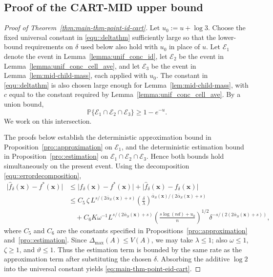 \documentclass[11pt]{article}
\theoremstyle{plain}
\theoremstyle{definition}
\theoremstyle{remark}
\theoremstyle{plain}
\newcommand{\bx}{\mathbf{x}}
\renewcommand{\P}{\mathbb{P}}
\newcommand{\1}{\mathbbm{1}}
\begin{document}
\subsection{Proof of the CART-MID upper bound}

\begin{proof}[Proof of Theorem~\ref{thm:main-thm-point-id-cart}]
Let $u_0:=u+\log 3$.
Choose the fixed universal constant in \eqref{equ::deltathm} sufficiently large so that the lower-bound requirements on $\delta$ used below also hold with $u_0$ in place of $u$.
Let $\mathcal{E}_1$ denote the event in Lemma~\ref{lemma:unif_conc_id},
let $\mathcal{E}_2$ be the event in
Lemma~\ref{lemma:unif_conc_cell_ave},
and let $\mathcal E_3$ be
the event in Lemma~\ref{lem:mid-child-mass}, each applied with $u_0$.
The constant in \eqref{equ::deltathm} is also chosen large enough for
Lemma~\ref{lem:mid-child-mass}, with $c$ equal to the constant required
by Lemma~\ref{lemma:unif_conc_cell_ave}. By a union bound,
\[
\P\{\mathcal{E}_1\cap\mathcal{E}_2\cap\mathcal E_3\}
\ge 1-e^{-u}.
\]
We work on this intersection.

The proofs below establish the deterministic approximation bound in
Proposition~\ref{pro::approximation} on $\mathcal E_1$, and the
deterministic estimation bound in Proposition~\ref{pro::estimation} on
$\mathcal E_1\cap\mathcal E_2\cap\mathcal E_3$.
Hence both bounds hold simultaneously on
the present event.
Using the decomposition \eqref{equ::errordecomposition},
\begin{align*}
\bigl|\hat{f}_{\delta}(\bx)-f^*(\bx)\bigr|
&\le 
\bigl|f_{\delta}(\bx)-f^*(\bx)\bigr|
+
\bigl|\hat{f}_{\delta}(\bx)-f_{\delta}(\bx)\bigr| \\
&\le
C_5\,
\zeta\,
L^{s/(2\bar\alpha_S(\bx)+s)}
\left(\frac{\delta}{\lambda}\right)^{
\bar\alpha_S(\bx)/(2\bar\alpha_S(\bx)+s)}
\\
&\quad+
C_6 K
\omega^{-1}
L^{s/(2\bar\alpha_S(\bx)+s)}
\left(
\frac{s\log(nd)+u_0}{n}
\right)^{1/2}
\delta^{-s/(2(2\bar\alpha_S(\bx)+s))},
\end{align*}
where $C_5$ and $C_6$ are the constants specified in Propositions~\ref{pro::approximation} and~\ref{pro::estimation}.
Since $\Delta_{\max}(A)\le V(A)$, we may take $\lambda\le1$; also $\omega\le1$, $\zeta\ge1$, and $\vartheta\le1$. Thus the estimation term is bounded by the same rate as the approximation term after substituting the chosen $\delta$.
Absorbing the additive $\log 2$ into the universal constant yields \eqref{eq:main-thm-point-eid-cart}.
\end{proof}
\end{document}
